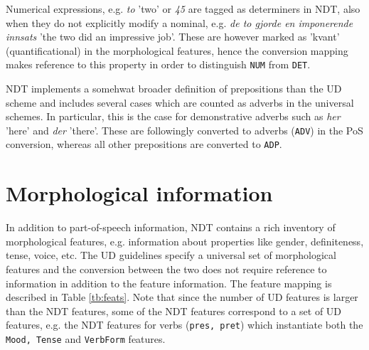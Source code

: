 \documentclass[10pt, a4paper]{article}
\begin{document}
Numerical expressions, e.g. {\it to} 'two' or {\it 45} are tagged as
determiners in NDT, also when they do not explicitly modify a nominal,
e.g. {\it de to gjorde en imponerende innsats} 'the two did an
impressive job'. These are however marked as 'kvant'
(quantificational) in the morphological features, hence the conversion
mapping makes reference to this property in order to distinguish {\tt NUM} from {\tt DET}.

NDT implements a somehwat broader definition of prepositions than the UD
scheme and includes several cases which are counted as adverbs in the
universal schemes. In particular, this is the case for demonstrative
adverbs such as {\it her} 'here' and {\it der} 'there'. These are
followingly converted to adverbs ({\tt ADV}) in the PoS conversion, whereas all
other prepositions are converted to {\tt ADP}.

\section{Morphological information}
In addition to part-of-speech information, NDT contains a rich
inventory of morphological features, e.g. information about properties
like gender, definiteness, tense, voice, etc. The UD guidelines
specify a universal set of morphological features and the conversion
between the two does not require reference to
information in addition to the feature information. The feature
mapping is described in Table \ref{tb:feats}.  Note that since the
number of UD features is larger than the NDT features, some of the NDT
features correspond to a set of UD features, e.g. the NDT features for
verbs ({\tt pres, pret}) which instantiate both the {\tt Mood, Tense}
and {\tt VerbForm} features.

\end{document}
